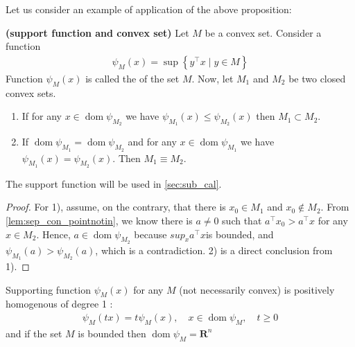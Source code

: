 \documentclass{article}
\newcommand{\bfs}[1]{\textbf{({#1}) }}
\newcommand{\dom}{\operatorname{dom}}
\begin{document}
Let us consider an example of application of the above proposition:
\begin{cora}\bfs{support function and convex set}\label{cora:sfcs}
Let $M$ be a convex set. Consider a function
\begin{align}
\psi_{M}(x)=\sup \left\{y^{\top} x \mid y \in M\right\}\label{eq:supp_def}
\end{align}
Function $\psi_{M}(x)$ is called the  of the set $M$.
Now, let $M_{1}$ and $M_{2}$ be two closed convex sets.
\begin{enumerate}
    \item If for any $x \in \dom \psi_{M_{2}}$ we have $\psi_{M_{1}}(x) \leq \psi_{M_{2}}(x)$ then $M_{1} \subset M_{2}$.
    \item If $\dom \psi_{M_{1}}=\dom \psi_{M_{2}}$ and for any $x \in \dom \psi_{M_{1}}$ we have $\psi_{M_{1}}(x)=\psi_{M_{2}}(x) .$ Then $M_{1} \equiv M_{2}$.
\end{enumerate}
\end{cora} 
\begin{rema}
The support function will be used in \cref{sec:sub_cal}.
\end{rema}
\begin{proof}\color{ForestGreen}
For 1), assume, on the contrary, that there is $x_{0} \in M_{1}$ and $x_{0} \notin M_{2} .$ From \cref{lem:sep_con_pointnotin}, we know there is $a \neq 0$ such that $a^{\top} x_{0}>a^{\top} x$ for any $x \in M_{2} .$ Hence, $a \in \dom \psi_{M_{2}}$ because $sup_x a^\top x $is bounded, and $\psi_{M_{1}}(a)>\psi_{M_{2}}(a)$, which is a contradiction. 2) is a direct conclusion from 1).
\end{proof}
\begin{rema}
Supporting function $\psi_{M}(x)$ for any $M$ (not necessarily convex) is positively homogenous of degree 1 :
\begin{align*}
\psi_{M}(t x)=t \psi_{M}(x), \quad x \in \dom \psi_{M}, \quad t \geq 0
\end{align*}
and if the set $M$ is bounded then $\dom \psi_{M}=\mathbf{R}^{n}$
\end{rema}
\end{document}
